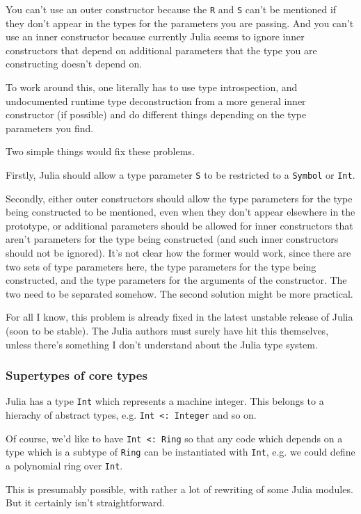 \documentclass[a4paper,10pt]{article}
\newcommand{\code}{\lstinline}
\begin{document}
You can't use an outer constructor because the \code{R} and \code{S} can't be mentioned if they don't
appear in the types for the parameters you are passing. And you can't use an inner constructor because
currently Julia seems to ignore inner constructors that depend on additional parameters that the type 
you are constructing doesn't depend on.

To work around this, one literally has to use type introspection, and undocumented runtime type 
deconstruction from a more general inner constructor (if possible) and do different things depending
on the type parameters you find.

Two simple things would fix these problems.

Firstly, Julia should allow a type parameter \code{S} to be restricted to a \code{Symbol} or \code{Int}.

Secondly, either outer constructors should allow the type parameters for the type being constructed to 
be mentioned, even when they don't appear elsewhere in the prototype, or additional parameters should be 
allowed for inner constructors that aren't parameters for the type being constructed (and such inner 
constructors should not be ignored). It's not clear how the former would work, since there are two sets 
of type parameters here, the type parameters for the type being constructed, and the type parameters for
the arguments of the constructor. The two need to be separated somehow. The second solution might be
more practical. 

For all I know, this problem is already fixed in the latest unstable release of Julia (soon to be stable).
The Julia authors must surely have hit this themselves, unless there's something I don't understand
about the Julia type system.

\subsubsection{Supertypes of core types}

Julia has a type \code{Int} which represents a machine integer. This belongs to a hierachy of abstract
types, e.g. \code{Int <: Integer} and so on. 

Of course, we'd like to have \code{Int <: Ring} so that any code which depends on a type which is a subtype
of \code{Ring} can be instantiated with \code{Int}, e.g. we could define a polynomial ring over \code{Int}.

This is presumably possible, with rather a lot of rewriting of some Julia modules. But it certainly isn't
straightforward.
\end{document}
